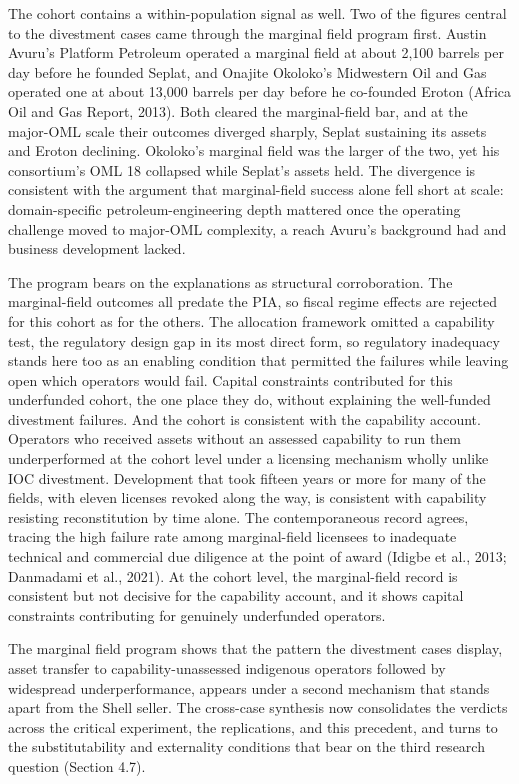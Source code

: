 The cohort contains a within-population signal as well. Two of the
figures central to the divestment cases came through the marginal field
program first. Austin Avuru's Platform Petroleum operated a marginal
field at about 2,100 barrels per day before he founded Seplat, and
Onajite Okoloko's Midwestern Oil and Gas operated one at about 13,000
barrels per day before he co-founded Eroton (Africa Oil and Gas Report,
2013). Both cleared the marginal-field bar, and at the major-OML scale
their outcomes diverged sharply, Seplat sustaining its assets and Eroton
declining. Okoloko's marginal field was the larger of the two, yet his
consortium's OML 18 collapsed while Seplat's assets held. The divergence
is consistent with the argument that marginal-field success alone fell
short at scale: domain-specific petroleum-engineering depth mattered
once the operating challenge moved to major-OML complexity, a reach
Avuru's background had and business development lacked.

The program bears on the explanations as structural corroboration. The
marginal-field outcomes all predate the PIA, so fiscal regime effects
are rejected for this cohort as for the others. The allocation framework
omitted a capability test, the regulatory design gap in its most direct
form, so regulatory inadequacy stands here too as an enabling condition
that permitted the failures while leaving open which operators would
fail. Capital constraints contributed for this underfunded cohort, the
one place they do, without explaining the well-funded divestment
failures. And the cohort is consistent with the capability account.
Operators who received assets without an assessed capability to run them
underperformed at the cohort level under a licensing mechanism wholly
unlike IOC divestment. Development that took fifteen years or more for
many of the fields, with eleven licenses revoked along the way, is
consistent with capability resisting reconstitution by time alone. The
contemporaneous record agrees, tracing the high failure rate among
marginal-field licensees to inadequate technical and commercial due
diligence at the point of award (Idigbe et al., 2013; Danmadami et al.,
2021). At the cohort level, the marginal-field record is consistent but
not decisive for the capability account, and it shows capital
constraints contributing for genuinely underfunded operators.

The marginal field program shows that the pattern the divestment cases
display, asset transfer to capability-unassessed indigenous operators
followed by widespread underperformance, appears under a second
mechanism that stands apart from the Shell seller. The cross-case
synthesis now consolidates the verdicts across the critical experiment,
the replications, and this precedent, and turns to the substitutability
and externality conditions that bear on the third research question
(Section 4.7).

